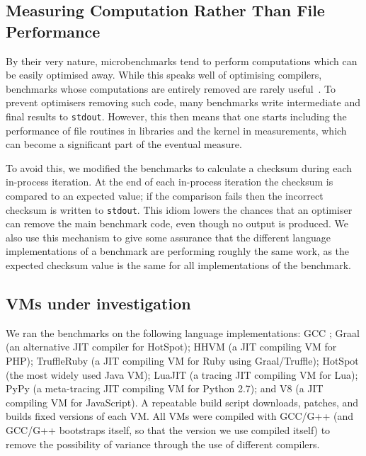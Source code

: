 \documentclass[acmsmall]{acmart}\settopmatter{printfolios=true}
\begin{document}
\subsection{Measuring Computation Rather Than File Performance}

By their very nature, microbenchmarks tend to perform computations which
can be easily optimised away. While this speaks well of
optimising compilers, benchmarks whose computations
are entirely removed are rarely useful~\cite{seaton15phd}. To prevent optimisers
removing such code, many benchmarks write intermediate and final results
to \texttt{stdout}. However, this then means that one starts including
the performance of file routines in libraries and the kernel in measurements,
which can become a significant part of the eventual measure.

To avoid this, we modified the benchmarks to calculate a checksum
during each in-process iteration. At the end of each in-process iteration
the checksum is compared to an expected value; if the comparison fails then
the incorrect checksum is written to \texttt{stdout}. This idiom
lowers the chances that an optimiser can remove the main benchmark
code, even though no output is produced. We also use this mechanism to give some assurance
that the different language implementations of a benchmark are performing
roughly the same work, as the expected checksum value is the same for all
implementations of the benchmark.


\subsection{VMs under investigation}
\label{sec:vms}

We ran the benchmarks on the following language implementations: GCC \gccversion;
Graal \graalversion (an alternative JIT compiler for HotSpot); HHVM \hhvmversion (a JIT
compiling VM for PHP); TruffleRuby \trufflerubyversion{} (a JIT compiling VM
for Ruby using Graal/Truffle);
HotSpot \hotspotversion (the most widely used Java
VM); LuaJIT \luajitversion (a tracing JIT compiling VM for Lua); PyPy \pypyversion (a
meta-tracing JIT compiling VM for Python 2.7); and V8 \veightversion (a JIT
compiling VM for JavaScript). A repeatable build script downloads, patches,
and builds fixed versions of each VM. All VMs were compiled with GCC/G++ \gccversion
(and GCC/G++ bootstraps itself, so that the version we use compiled itself)
to remove the possibility of variance through the use of different compilers.
\end{document}
